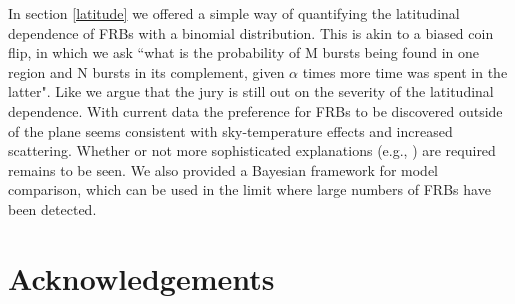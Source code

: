 \documentclass[useAMS,usenatbib]{mn2e}
\begin{document}
In section \ref{latitude} we offered a simple way of quantifying the 
latitudinal dependence of FRBs with a binomial distribution. This 
is akin to a biased coin flip, in which we ask ``what is the probability of 
M bursts being found in one region and N bursts in its complement, given 
$\alpha$ times more time was spent in the latter". Like \cite{2015arXiv150500834R} we argue
that the jury is still out on the severity of the latitudinal 
dependence. With current data the preference for FRBs to 
be discovered outside of the plane seems consistent with
sky-temperature effects and increased scattering. 
Whether or not more sophisticated explanations 
(e.g., \citealt{2015MNRAS.451.3278M}) are required remains to be seen. 
We also provided a Bayesian framework for model comparison,
which can be used in the limit where large numbers of FRBs have
been detected. 

\section{Acknowledgements}


\newcommand{\araa}{ARA\&A}   %
\newcommand{\afz}{Afz}       %
\newcommand{\aj}{AJ}         %
\newcommand{\azh}{AZh}       %
\newcommand{\aaa}{A\&A}      %
\newcommand{\aas}{A\&AS}     %
\newcommand{\aar}{A\&AR}     %
\newcommand{\apj}{ApJ}       %
\newcommand{\apjs}{ApJS}     %
\newcommand{\apjl}{ApJ}      %
\newcommand{\apss}{Ap\&SS}   %
\newcommand{\baas}{BAAS}     %
\newcommand{\jaa}{JA\&A}     %
\newcommand{\mnras}{MNRAS}   %
\newcommand{\nat}{Nat}       %
\newcommand{\pasj}{PASJ}     %
\newcommand{\pasp}{PASP}     %
\newcommand{\paspc}{PASPC}   %
\newcommand{\qjras}{QJRAS}   %
\newcommand{\sci}{Sci}       %
\newcommand{\solphys}{Solar Physics}       %
\newcommand{\sova}{SvA}      %
\newcommand{\aap}{A\&A}
\newcommand\jcap{{J. Cosmology Astropart. Phys.}}%
\newcommand{\prd}{Phys. Rev. D}

%




\label{lastpage}
\end{document}

